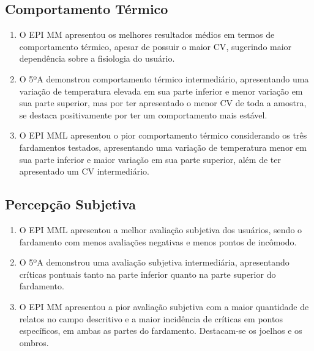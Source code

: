         \subsection{Comportamento Térmico}
            \begin{enumerate}[label=\Roman*.] %
                \item O \acrshort{EPI} \acrlong{MM} apresentou os melhores resultados médios em termos de 
                comportamento térmico, apesar de possuir o maior \acrlong{CV}, sugerindo maior dependência 
                sobre a fisiologia do usuário.
                \item O 5ºA demonstrou comportamento térmico intermediário, apresentando uma variação de 
                temperatura elevada em sua parte inferior e menor variação em sua parte superior, mas por 
                ter apresentado o menor \acrlong{CV} de toda a amostra, se destaca positivamente por ter 
                um comportamento mais estável.
                \item O \acrshort{EPI} \acrlong{MML} apresentou o pior comportamento térmico considerando os 
                três fardamentos testados, apresentando uma variação de temperatura menor em 
                sua parte inferior e maior variação em sua parte superior, além de 
                ter apresentado um \acrlong{CV} intermediário.
                \end{enumerate}    

        \subsection{Percepção Subjetiva}
            \begin{enumerate}[label=\Roman*.] %
                \item O \acrshort{EPI} \acrlong{MML} apresentou a melhor avaliação subjetiva dos usuários, 
                sendo o fardamento com menos avaliações negativas e menos pontos de incômodo.
                \item O 5ºA demonstrou uma avaliação subjetiva intermediária, apresentando críticas 
                pontuais tanto na parte inferior quanto na parte superior do fardamento.
                \item O \acrshort{EPI} \acrlong{MM} apresentou a pior avaliação subjetiva 
                com a maior quantidade de relatos no campo descritivo e a maior incidência de críticas em 
                pontos específicos, em ambas as partes do fardamento. Destacam-se os joelhos e os ombros.
                \end{enumerate}

